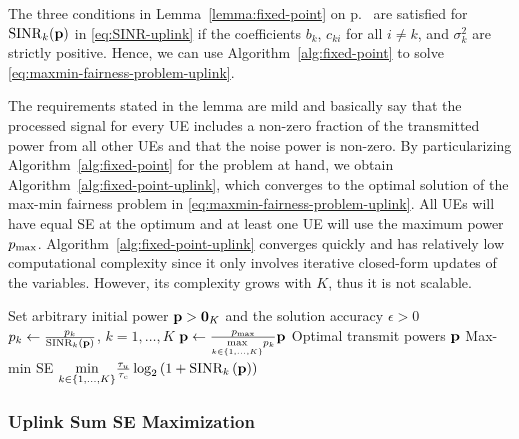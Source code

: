 \begin{lemma}
The three conditions in Lemma~\ref{lemma:fixed-point} on p.~\pageref{lemma:fixed-point} are satisfied for $\mathrm{SINR}_k(\mathbf{p})$ in \eqref{eq:SINR-uplink} if the coefficients $b_k$, $c_{ki}$ for all $i \neq k$, and $\sigma_k^2$ are strictly positive. Hence, we can use Algorithm~\ref{alg:fixed-point} to solve \eqref{eq:maxmin-fairness-problem-uplink}.
\end{lemma}

The requirements stated in the lemma are mild and basically say that the processed signal for every UE includes a non-zero fraction of the transmitted power from all other UEs and that the noise power is non-zero.
By particularizing Algorithm~\ref{alg:fixed-point}  for the problem at hand, we obtain Algorithm~\ref{alg:fixed-point-uplink}, which converges to the optimal solution of the max-min fairness problem in \eqref{eq:maxmin-fairness-problem-uplink}. 
All UEs will have equal SE at the optimum and at least one UE will use the maximum power $p_{\textrm{max}}$.
Algorithm~\ref{alg:fixed-point-uplink} converges quickly and has relatively low computational complexity since it only involves iterative closed-form updates of the variables. However, its complexity grows with $K$, thus it is not scalable.

\begin{algorithm}
	\caption{Fixed-point algorithm for solving the uplink max-min fairness problem in \eqref{eq:maxmin-fairness-problem-uplink}.} \label{alg:fixed-point-uplink}
	\begin{algorithmic}[1]
		 Set arbitrary initial power $\mathbf{p}>\mathbf{0}_K$ and the solution accuracy $\epsilon>0$
		\State $p_k \gets \frac{p_k}{\textrm{SINR}_k\left(\mathbf{p}\right)}$, $k=1,\ldots,K$
		\State $\mathbf{p} \gets \frac{p_{\rm max}}{\underset{k\in\{1,\ldots,K\}}{\max}p_k}\mathbf{p}$
		\EndWhile
		 Optimal transmit powers $\mathbf{p}$
		\State Max-min SE $\underset{k\in\{1,\ldots,K\}}{\min} \frac{\tau_u}{\tau_c}\log_2\left(1+ \textrm{SINR}_k\left(\mathbf{p}\right)\right)$
	\end{algorithmic}
\end{algorithm}



\subsubsection{Uplink Sum SE Maximization}

